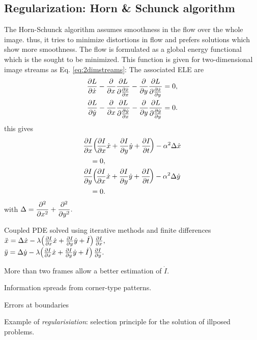 \begin{compactdesc}
		\section{Regularization: Horn \& Schunck algorithm} 
		The Horn-Schunck algorithm assumes smoothness in the flow over the whole image. thus, it tries to minimize distortions in flow and prefers solutions which show more smoothness. The flow is formulated as a global energy functional which is the sought to be minimized. This function is given for two-dimensional image streams as Eq. \ref{eq:2dimstreams}:
		The associated ELE are 
		\begin{align*}
			\frac{\partial L}{\partial \dot{x}}-\frac{\partial }{\partial x}\frac{\partial L}{\partial \frac{\partial \dot{x}}{\partial x}}-\frac{\partial }{\partial y}\frac{\partial L}{\partial \frac{\partial \dot{x}}{\partial y}}&=0,\\
			\frac{\partial L}{\partial \dot{y}}-\frac{\partial }{\partial x}\frac{\partial L}{\partial \frac{\partial \dot{y}}{\partial x}}-\frac{\partial }{\partial y}\frac{\partial L}{\partial \frac{\partial \dot{y}}{\partial y}}&=0.
		\end{align*}
			this gives
		\begin{align*}
			&\frac{\partial I}{\partial x}\!\left(\! \frac{\partial I}{\partial x}\dot{x}+\frac{\partial I}{\partial y}\dot{y}+\frac{\partial I}{\partial t} \!\right)-\alpha^2\Delta \dot{x}\\
			&\quad=0,\\
			&\frac{\partial I}{\partial y}\!\left(\! \frac{\partial I}{\partial x}\dot{x}+\frac{\partial I}{\partial y}\dot{y}+\frac{\partial I}{\partial t} \!\right)-\alpha^2\Delta \dot{y}\\
			&\quad=0.
		\end{align*}
		with $\displaystyle\Delta=\frac{\partial^{2} }{\partial x ^{2}}+\frac{\partial^{2} }{\partial y ^{2}}.$
	\item[\lp{Remarks}]\hfill
		\begin{enumerate*}[label=\protect\circled{\arabic*}]
			\item Coupled PDE solved using iterative methods and finite differences
				$\ddot{x}=\Delta \dot{x}-\lambda\!\left( \frac{\partial I}{\partial x}\dot{x}+\frac{\partial I}{\partial y}\dot{y}+\dot{I} \right)\frac{\partial I}{\partial x},\\$\\
				$\ddot{y}=\Delta \dot{y}-\lambda\!\left( \frac{\partial I}{\partial x}\dot{x}+\frac{\partial I}{\partial y}\dot{y}+\dot{I} \right)\frac{\partial I}{\partial y}.$
		\item More than two frames allow a better estimation of $\dot{I}$.
			\item Information spreads from corner-type patterns.
			\item Errors at boundaries
			\item Example of \emph{regularisiation}: selection principle for the solution of illposed problems.
		\end{enumerate*}

\end{compactdesc}
